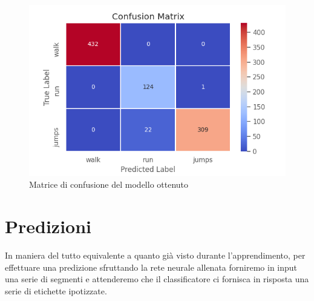 \begin{figure}[H]
    \centering
    \includegraphics[scale = 0.60]{assets/images/classifications/accelerometer/right_hand/confusion-matrix-right-hand-acc.png}
    \caption{Matrice di confusione del modello ottenuto}
\end{figure}


\section{Predizioni}
In maniera del tutto equivalente a quanto già visto durante l'apprendimento, per effettuare una predizione sfruttando
la rete neurale allenata forniremo in input una serie di segmenti e attenderemo che il classificatore ci fornisca in risposta
una serie di etichette ipotizzate.


